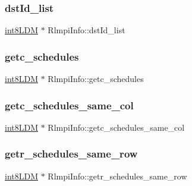 \mbox{\label{structRlmpiInfo_ad9c264950416b333c6e8637a379342eb}} 
\subsubsection{\texorpdfstring{dstId\_list}{dstId\_list}}
{\footnotesize\ttfamily \mbox{\hyperlink{include_2RlmpiShared_8h_a69782ffde89d45e86308f10afedf08a6}{int8\+L\+DM}} $\ast$ Rlmpi\+Info\+::dst\+Id\+\_\+list}

\mbox{\label{structRlmpiInfo_aa6f288dc8233f10755fa2b255c790719}} 
\subsubsection{\texorpdfstring{getc\_schedules}{getc\_schedules}}
{\footnotesize\ttfamily \mbox{\hyperlink{include_2RlmpiShared_8h_a69782ffde89d45e86308f10afedf08a6}{int8\+L\+DM}} $\ast$ Rlmpi\+Info\+::getc\+\_\+schedules}

\mbox{\label{structRlmpiInfo_a591af1c72cf5b3d7501dfdde0ce34ec2}} 
\subsubsection{\texorpdfstring{getc\_schedules\_same\_col}{getc\_schedules\_same\_col}}
{\footnotesize\ttfamily \mbox{\hyperlink{include_2RlmpiShared_8h_a69782ffde89d45e86308f10afedf08a6}{int8\+L\+DM}} $\ast$ Rlmpi\+Info\+::getc\+\_\+schedules\+\_\+same\+\_\+col}

\mbox{\label{structRlmpiInfo_afe776511dd4d7aabb1c6c3b83f4bd5bf}} 
\subsubsection{\texorpdfstring{getr\_schedules\_same\_row}{getr\_schedules\_same\_row}}
{\footnotesize\ttfamily \mbox{\hyperlink{include_2RlmpiShared_8h_a69782ffde89d45e86308f10afedf08a6}{int8\+L\+DM}} $\ast$ Rlmpi\+Info\+::getr\+\_\+schedules\+\_\+same\+\_\+row}

